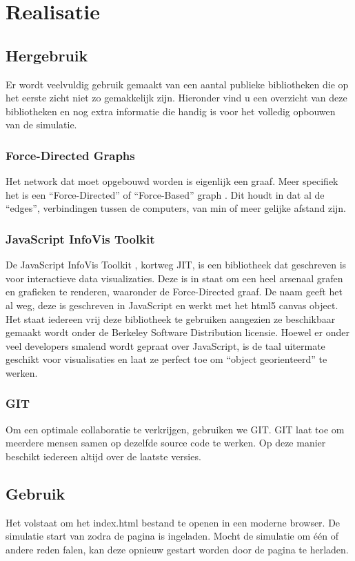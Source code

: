 \documentclass[a4paper,oneside]{report}
\begin{document}
\chapter{Realisatie}
\section{Hergebruik}
Er wordt veelvuldig gebruik gemaakt van een aantal publieke bibliotheken die op het eerste
zicht niet zo gemakkelijk zijn. Hieronder vind u een overzicht van deze bibliotheken en nog
extra informatie die handig is voor het volledig opbouwen van de simulatie.
\subsection{Force-Directed Graphs}
Het network dat moet opgebouwd worden is eigenlijk een graaf. Meer specifiek het is een
``Force-Directed'' of ``Force-Based'' graph \cite{ForceBasedGraph}.
Dit houdt in dat al de ``edges'', verbindingen tussen de computers, van min of meer gelijke afstand zijn.
\subsection{JavaScript InfoVis Toolkit}
De JavaScript InfoVis Toolkit \cite{InfoVis}, kortweg JIT, is een bibliotheek dat geschreven is voor interactieve
data visualizaties. Deze is in staat om een heel arsenaal grafen en grafieken te renderen, waaronder
de Force-Directed graaf.
De naam geeft het al weg, deze is geschreven in JavaScript en werkt met het html5 canvas object.
Het staat iedereen vrij deze bibliotheek te gebruiken aangezien ze beschikbaar gemaakt wordt onder
de Berkeley Software Distribution licensie.
Hoewel er onder veel developers smalend wordt gepraat over JavaScript, is de taal uitermate geschikt voor visualisaties
en laat ze perfect toe om ``object georienteerd'' te werken.
\subsection{GIT}
Om een optimale collaboratie te verkrijgen, gebruiken we GIT.
GIT laat toe om meerdere mensen samen op dezelfde source code te werken.
Op deze manier beschikt iedereen altijd over de laatste versies.

\section{Gebruik}
Het volstaat om het index.html bestand te openen in een moderne browser. De simulatie start van zodra de pagina is ingeladen.
Mocht de simulatie om één of andere reden falen, kan deze opnieuw gestart worden door de pagina te herladen.
\end{document}
